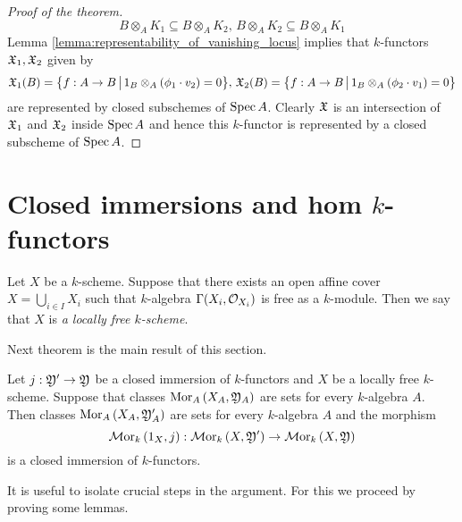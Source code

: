 \begin{proof}[Proof of the theorem]
$$B\otimes_AK_1 \subseteq B\otimes_AK_2,\,B\otimes_AK_2\subseteq B\otimes_AK_1$$
Lemma \ref{lemma:representability_of_vanishing_locus} implies that $k$-functors ${\mathfrak X}_1,{\mathfrak X}_2$ given by
$${\mathfrak X}_1(B) = \big\{f:A\rightarrow B\,\big|\,1_B\otimes_A\left(\phi_1\cdot v_2\right) = 0\big\},\,{\mathfrak X}_2(B) =  \big\{f:A\rightarrow B\,\big|\,1_B\otimes_A\left(\phi_2\cdot v_1\right) = 0\big\}$$
are represented by closed subschemes of $\mathrm{Spec}\, A$. Clearly ${\mathfrak X}$ is an intersection of ${\mathfrak X}_1$ and ${\mathfrak X}_2$ inside $\mathrm{Spec}\, A$ and hence this $k$-functor is represented by a closed subscheme of $\mathrm{Spec}\, A$.
\end{proof}

\section{Closed immersions and hom $k$-functors}

\begin{definition}
Let $X$ be a $k$-scheme. Suppose that there exists an open affine cover $X = \bigcup_{i\in I}X_i$ such that $k$-algebra $\Gamma(X_i,{\mathcal O}_{X_i})$ is free as a $k$-module. Then we say that $X$ is \textit{a locally free $k$-scheme}.
\end{definition}
\noindent
Next theorem is the main result of this section.

\begin{theorem}\label{theorem:closed_immersions_and_internal_hom}
Let $j:{\mathfrak Y}'\rightarrow {\mathfrak Y}$ be a closed immersion of $k$-functors and $X$ be a locally free $k$-scheme. Suppose that classes $\mathrm{Mor}_A\left(X_A,{\mathfrak Y}_A\right)$ are sets for every $k$-algebra $A$. Then classes $\mathrm{Mor}_A\left(X_A,{\mathfrak Y}'_A\right)$ are sets for every $k$-algebra $A$ and the morphism
$$\mathcal{M}\mathrm{or}_k\left(1_{X},j\right):\mathcal{M}\mathrm{or}_k\left(X,{\mathfrak Y}'\right)\rightarrow \mathcal{M}\mathrm{or}_k\left(X,{\mathfrak Y}\right)$$
is a closed immersion of $k$-functors.
\end{theorem}
\noindent
It is useful to isolate crucial steps in the argument. For this we proceed by proving some lemmas.

